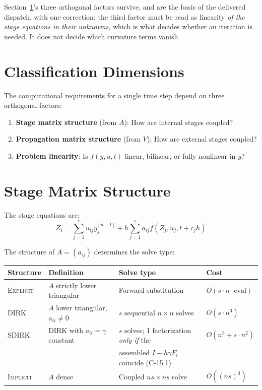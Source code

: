\documentclass[11pt]{article}
\begin{document}
Section~\ref{sec:classification}'s three orthogonal factors survive, and are
the basis of the delivered dispatch, with one correction: the third factor must
be read as linearity \emph{of the stage equations in their unknowns}, which is
what decides whether an iteration is needed. It does not decide which curvature
terms vanish.


\section{Classification Dimensions}
\label{sec:classification}

The computational requirements for a single time step depend on three orthogonal factors:

\begin{enumerate}
\item \textbf{Stage matrix structure} (from $A$): How are internal stages coupled?
\item \textbf{Propagation matrix structure} (from $V$): How are external stages coupled?
\item \textbf{Problem linearity}: Is $f(y,u,t)$ linear, bilinear, or fully nonlinear in $y$?
\end{enumerate}

\section{Stage Matrix Structure}

The stage equations are:
\[
Z_i = \sum_{j=1}^r u_{ij} y_j^{[n-1]} + h\sum_{j=1}^s a_{ij} f(Z_j, u_j, t+c_jh)
\]

The structure of $A = (a_{ij})$ determines the solve type:

\begin{center}
\begin{tabular}{llll}
\toprule
Structure & Definition & Solve type & Cost \\
\midrule
\textsc{Explicit} & $A$ strictly lower triangular & Forward substitution & $O(s \cdot n \cdot \text{eval})$ \\
\textsc{DIRK} & $A$ lower triangular, $a_{ii} \neq 0$ & $s$ sequential $n\times n$ solves & $O(s \cdot n^3)$ \\
\textsc{SDIRK} & DIRK with $a_{ii} = \gamma$ constant & $s$ solves; 1 factorization \emph{only if} the & $O(n^3 + s \cdot n^2)$ \\
 & & assembled $I-h\gamma F_i$ coincide (C-15.1) & \\
\textsc{Implicit} & $A$ dense & Coupled $ns \times ns$ solve & $O((ns)^3)$ \\
\bottomrule
\end{tabular}
\end{center}
\end{document}
